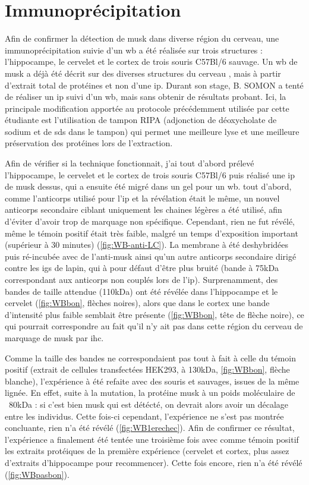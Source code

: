 \section{Immunoprécipitation}
\label{sec:IPresultat}
	Afin de confirmer la détection de \gls{musk} dans diverse région du cerveau, une immunoprécipitation suivie d'un \gls{wb} a été réalisée sur trois structures : l'hippocampe, le cervelet et le cortex de trois souris C57Bl/6 sauvage. Un \gls{wb} de \gls{musk} a déjà été décrit sur des diverses structures du cerveau \cite{Garcia-Osta2006}, mais à partir d'extrait total de protéines et non d'une \gls{ip}. Durant son stage, B. SOMON a tenté de réaliser un \gls{ip} suivi d'un \gls{wb}, mais sans obtenir de résultats probant. Ici, la principale modification apportée au protocole précédemment utilisée par cette étudiante est l'utilisation de tampon RIPA (adjonction de déoxycholate de sodium et de \acrshort{sds} dans le tampon) qui permet une meilleure lyse et une meilleure préservation des protéines lors de l'extraction.
	
	Afin de vérifier si la technique fonctionnait, j'ai tout d'abord prélevé l'hippocampe, le cervelet et le cortex de trois souris C57Bl/6 puis réalisé une \gls{ip} de \gls{musk} dessus, qui a ensuite été migré dans un gel pour un \gls{wb}. tout d'abord, comme l'anticorps utilisé pour l'\gls{ip} et la révélation était le même, un nouvel anticorps secondaire ciblant uniquement les chaines légères a été utilisé, afin d'éviter d'avoir trop de marquage non spécifique. Cependant, rien ne fut révélé, même le témoin positif était très faible, malgré un temps d'exposition important (supérieur à 30 minutes) (\cref{fig:WB-anti-LC}). La membrane à été deshybridées puis ré-incubée avec de l'anti-\gls{musk} ainsi qu'un autre anticorps secondaire dirigé contre les \glspl{ig} de lapin, qui à pour défaut d'être plus bruité (bande à 75kDa correspondant aux anticorps non couplés lors de l'\gls{ip}). Surprenamment, des bandes de taille attendue (110kDa) ont été révélée dans l'hippocampe et le cervelet (\cref{fig:WBbon}, flèches noires), alors que dans le cortex une bande d'intensité plus faible semblait être présente (\cref{fig:WBbon}, tête de flèche noire), ce qui pourrait correspondre au fait qu'il n'y ait pas dans cette région du cerveau de marquage de \gls{musk} par \gls{ihc}. 
	
	Comme la taille des bandes ne correspondaient pas tout à fait à celle du témoin positif (extrait de cellules transfectées HEK293, à 130kDa, \cref{fig:WBbon}, flèche blanche), l'expérience à été refaite avec des souris \mcrd et sauvages, issues de la même lignée. En effet, suite à la mutation, la protéine \gls{musk} à un poids moléculaire de ~80kDa : si c'est bien \gls{musk} qui est détécté, on devrait alors avoir un décalage entre les individus. Cette fois-ci cependant, l'expérience ne s'est pas montrée concluante, rien n'a été révélé (\cref{fig:WB1erechec}). Afin de confirmer ce résultat, l'expérience a finalement été tentée une troisième fois avec comme témoin positif les extraits protéiques de la première expérience (cervelet et cortex, plus assez d'extraits d'hippocampe pour recommencer). Cette fois encore, rien n'a été révélé (\cref{fig:WBpasbon}).
	
